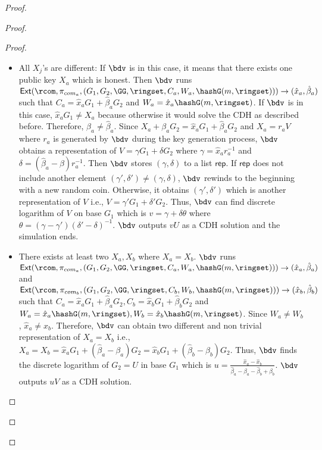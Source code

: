 \begin{proof}
\begin{proof}
\begin{proof}
			\begin{itemize}
				\item All $ X_j$'s are different: If $ \bdv $ is in this case, it means that there exists one public key $ X_a $ which is honest. Then $ \bdv $ runs $ \mathsf{Ext}(\rcom,\pi_{com_a},(G_1,G_2, \GG,\ringset, C_a,W_a,\hashG(m,\ringset))) \rightarrow (\hat{x}_a,\hat{\beta}_a )$ such that $ C_a = \hat{x}_aG_1 + \hat{\beta}_a G_2 $ and $ W_a = \hat{x}_a \hashG(m,\ringset) $.  If $ \bdv $ is in this case, $ \hat{x}_aG_1\neq X_a $ because otherwise it would solve the CDH as described before. Therefore, $ \beta_a \neq \hat{\beta}_a $. Since $ X_a + \beta_a G_2 = \hat{x}_aG_1 + \hat{\beta}_a G_2  $ and $ X_a = r_aV $ where $ r_a $ is generated by $ \bdv $ during the key generation process, $ \bdv $ obtains a representation of $ V = \gamma G_1 + \delta G_2 $ where $ \gamma = \hat{x}_ar^{-1}_a  $ and $ \delta = (\hat{\beta}_a -\beta)r_a^{-1} $. Then $ \bdv $ stores $ (\gamma, \delta) $ to a list $ \mathsf{rep} $. If $ \mathsf{rep} $ does not include another element $ (\gamma', \delta')  \neq (\gamma, \delta) $, $ \bdv $ rewinds \adv to the beginning with a new random coin.  Otherwise, it obtains $ (\gamma', \delta') $ which is another representation of $ V $ i.e., $ V = \gamma' G_1 + \delta' G_2 $. Thus, $ \bdv $ can find discrete logarithm of $ V $ on base $ G_1 $ which is $ v = \gamma + \delta \theta $ where $ \theta = (\gamma - \gamma')(\delta' - \delta)^{-1} $. $ \bdv $ outputs $ vU $ as a CDH solution and the simulation ends.
				
				
				\item There exists at least two $ X_a,X_b $ where $ X_a = X_b $. $ \bdv $ runs $ \mathsf{Ext}(\rcom,\pi_{com_a},(G_1,G_2, \GG,\ringset, C_a,W_a,\hashG(m,\ringset))) \rightarrow (\hat{x}_a,\hat{\beta}_a )$ and $ \mathsf{Ext}(\rcom,\pi_{com_b},(G_1,G_2, \GG,\ringset, C_b,W_b,\hashG(m,\ringset))) \rightarrow (\hat{x}_b,\hat{\beta}_b )$ such that $ C_a = \hat{x}_aG_1 + \hat{\beta}_a G_2, C_b = \hat{x}_bG_1 + \hat{\beta}_b G_2 $ and $ W_a = \hat{x}_a \hashG(m,\ringset), W_b = \hat{x}_b \hashG(m,\ringset) $. Since $ W_a \neq W_b $, $ \hat{x}_a \neq \hat{x}_b $.  Therefore, $ \bdv $ can obtain  two different and non trivial representation of $ X_a = X_b $ i.e., $ X_a = X_b = \hat{x}_aG_1 + (\hat{\beta}_a - \beta_a) G_2 = \hat{x}_bG_1 + (\hat{\beta}_b - \beta_b) G_2  $. Thus, $ \bdv $ finds the discrete logarithm of $ G_2 = U $ in base $ G_1 $ which is $ u = \frac{\hat{x}_a - \hat{x}_b}{\hat{\beta}_a -\beta_a -\hat{\beta}_b + \beta_b} $. $ \bdv $ outputs $ uV $ as a CDH solution.
			\end{itemize}
			

\end{proof}
\end{proof}
\end{proof}
